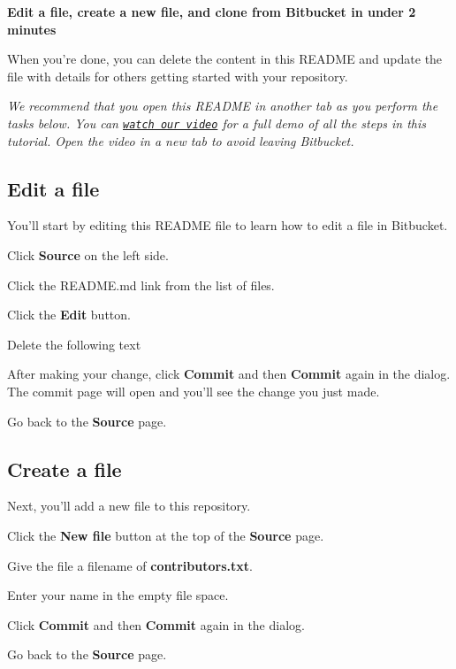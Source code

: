{\bfseries Edit a file, create a new file, and clone from Bitbucket in under 2 minutes}

When you're done, you can delete the content in this R\+E\+A\+D\+M\+E and update the file with details for others getting started with your repository.

{\itshape We recommend that you open this R\+E\+A\+D\+M\+E in another tab as you perform the tasks below. You can \href{https://youtu.be/0ocf7u76WSo}{\tt watch our video} for a full demo of all the steps in this tutorial. Open the video in a new tab to avoid leaving Bitbucket.} 



\subsection*{Edit a file}

You’ll start by editing this R\+E\+A\+D\+M\+E file to learn how to edit a file in Bitbucket.


\begin{DoxyEnumerate}
\item Click {\bfseries Source} on the left side.
\item Click the R\+E\+A\+D\+M\+E.\+md link from the list of files.
\item Click the {\bfseries Edit} button.
\item Delete the following text
\item After making your change, click {\bfseries Commit} and then {\bfseries Commit} again in the dialog. The commit page will open and you’ll see the change you just made.
\item Go back to the {\bfseries Source} page. 


\end{DoxyEnumerate}

\subsection*{Create a file}

Next, you’ll add a new file to this repository.


\begin{DoxyEnumerate}
\item Click the {\bfseries New file} button at the top of the {\bfseries Source} page.
\item Give the file a filename of {\bfseries contributors.\+txt}.
\item Enter your name in the empty file space.
\item Click {\bfseries Commit} and then {\bfseries Commit} again in the dialog.
\item Go back to the {\bfseries Source} page.
\end{DoxyEnumerate}

